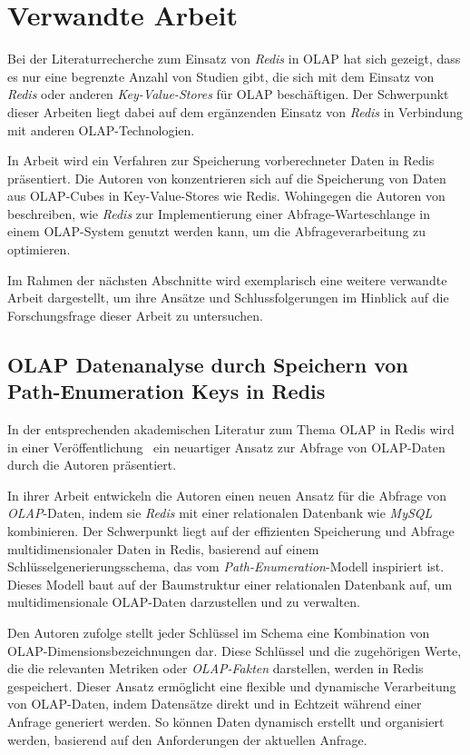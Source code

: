 \chapter{Verwandte Arbeit}
Bei der Literaturrecherche zum Einsatz von \emph{Redis} in OLAP hat sich gezeigt, dass es nur eine begrenzte Anzahl von Studien gibt, die sich mit dem  Einsatz von \emph{Redis} oder anderen \emph{Key-Value-Stores} für OLAP beschäftigen. Der Schwerpunkt dieser Arbeiten liegt dabei auf dem ergänzenden Einsatz von \emph{Redis} in Verbindung mit anderen OLAP-Technologien.

In Arbeit \cite{franciscus_answering_2017} wird ein Verfahren zur Speicherung vorberechneter Daten in Redis präsentiert. Die Autoren von \cite{zhao_multidimensional_2014} konzentrieren sich auf die Speicherung von Daten aus OLAP-Cubes in Key-Value-Stores wie Redis. Wohingegen die Autoren von \cite{ly_implementation_2017} beschreiben, wie \emph{Redis} zur Implementierung einer Abfrage-Warteschlange in einem OLAP-System genutzt werden kann, um die Abfrageverarbeitung zu optimieren.

Im Rahmen der nächsten Abschnitte wird exemplarisch eine weitere verwandte Arbeit dargestellt, um ihre Ansätze und Schlussfolgerungen im Hinblick auf die Forschungsfrage dieser Arbeit zu untersuchen.




\section{OLAP Datenanalyse durch Speichern von Path-Enumeration Keys in Redis}
In der entsprechenden akademischen Literatur zum Thema OLAP in Redis wird in einer Veröffentlichung~\cite{loyola_building_2012} ein neuartiger Ansatz zur Abfrage von OLAP-Daten durch die Autoren präsentiert.

In ihrer Arbeit entwickeln die Autoren einen neuen Ansatz für die Abfrage von \emph{OLAP}-Daten, indem sie \emph{Redis} mit einer relationalen Datenbank wie \emph{MySQL} kombinieren. Der Schwerpunkt liegt auf der effizienten Speicherung und Abfrage multidimensionaler Daten in Redis, basierend auf einem Schlüsselgenerierungsschema, das vom \emph{Path-Enumeration}-Modell inspiriert ist. Dieses Modell baut auf der Baumstruktur einer relationalen Datenbank auf, um multidimensionale OLAP-Daten darzustellen und zu verwalten.

Den Autoren zufolge stellt jeder Schlüssel im Schema eine Kombination von OLAP-Dimensionsbezeichnungen dar. Diese Schlüssel und die zugehörigen Werte, die die relevanten Metriken oder \emph{OLAP-Fakten} darstellen, werden in Redis gespeichert. Dieser Ansatz ermöglicht eine flexible und dynamische Verarbeitung von OLAP-Daten, indem Datensätze direkt und in Echtzeit während einer Anfrage generiert werden. So können Daten dynamisch erstellt und organisiert werden, basierend auf den Anforderungen der aktuellen Anfrage.

